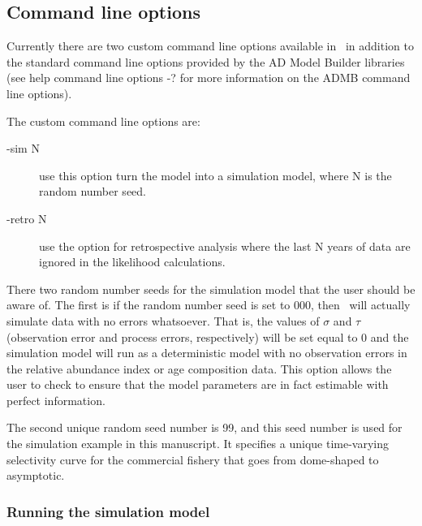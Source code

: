 


\begin{multicols}{2}

\subsection{Command line options}
Currently there are two custom command line options available in \iscam\ in addition to the standard command line options provided by the AD Model Builder libraries (see help command line options -? for more information on the ADMB command line options). 

The custom command line options are:
\begin{description}
\item[-sim N] use this option turn the model into a simulation model, where N is the random number seed.

\item[-retro N] use the option for retrospective analysis where the last N years of data are ignored in the likelihood calculations.
\end{description}

There two random number seeds for the simulation model that the user should be aware of.  The first is if the random number seed is set to 000, then \iscam\ will actually simulate data with no errors whatsoever.  That is, the values of $\sigma$ and $\tau$ (observation error and process errors, respectively) will be set equal to 0 and the simulation model will run as a deterministic model with no observation errors in the relative abundance index or age composition data.  This option allows the user to check to ensure that the model parameters are in fact estimable with perfect information.


The second unique random seed number is 99, and this seed number is used for the simulation example in this manuscript.  It specifies a unique time-varying selectivity curve for the commercial fishery that goes from dome-shaped to asymptotic.

\subsubsection{Running the simulation model}


\end{multicols}
